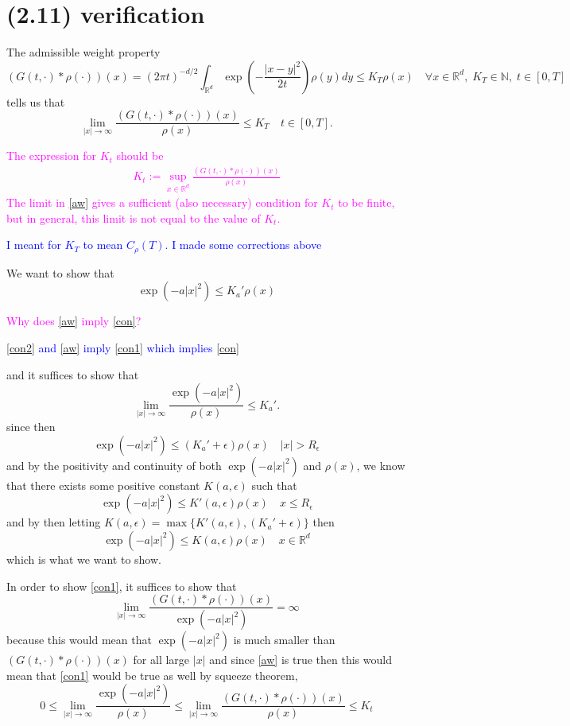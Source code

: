 \documentclass{article}
\numberwithin{equation}{section}
\newcommand{\R}{\mathbb{R}}
\begin{document}
\section{(2.11) verification}
The admissible weight property
\[
\left(G(t,\cdot)*\rho(\cdot)\right)(x) =(2\pi t)^{-d/2} \int_{\mathbb R^d}\exp\left(-\frac{|x-y|^2}{2t}\right)\rho(y)dy \le K_T\rho(x) \quad \forall x \in \mathbb R^d,\; K_T \in \mathbb N,\; t\in[0,T]
\]
tells us that
\begin{equation} \label{aw}
\lim_{|x| \to \infty}\frac{\left(G(t,\cdot)*\rho(\cdot)\right)(x)}{\rho(x)} \le K_T \quad t \in [0,T].
\end{equation}

\bigskip
\textcolor{magenta}{The expression for $K_t$ should be
\begin{align*}
	K_t:= \sup_{x\in\R^d} \frac{\left(G(t,\cdot)*\rho(\cdot)\right)(x)}{\rho(x)}
\end{align*}
The limit in \eqref{aw} gives a sufficient (also necessary) condition for $K_t$ to be finite, but in general, this limit is not equal to the value of $K_t$.
}

\textcolor{blue}{I meant for $K_T$ to mean $C_\rho(T)$. I made some corrections above}


We want to show that
\begin{equation} \label{con}
\exp\left(-a|x|^2\right) \le K_a'\rho(x)
\end{equation}

\bigskip
\textcolor{magenta}{Why does \eqref{aw} imply \eqref{con}?}

\textcolor{blue}{\eqref{con2} and \eqref{aw} imply \eqref{con1} which implies \eqref{con}}

and it suffices to show that
\begin{equation} \label{con1}
\lim_{|x| \to \infty}\frac{\exp\left(-a|x|^2\right)}{\rho(x)} \le K_a'.
\end{equation}
since then
\[
\exp\left(-a|x|^2\right) \le (K_a'+\epsilon)\rho(x) \quad |x|>R_\epsilon
\]
and by the positivity and continuity of both $	\exp\left(-a|x|^2\right)$ and $\rho(x)$, we know that there exists some positive constant $K(a,\epsilon)$ such that
\[
\exp\left(-a|x|^2\right) \le K'(a,\epsilon)\rho(x) \quad x\le R_\epsilon
\]
and by then letting $K(a,\epsilon) = \max\{K'(a,\epsilon),(K_a'+\epsilon)\}$ then
\[
	\exp\left(-a|x|^2\right) \le K(a,\epsilon)\rho(x) \quad x \in \R^d
\]
which is what we want to show.

In order to show \eqref{con1}, it suffices to show that
\begin{equation} \label{con2}
	\lim_{|x| \to \infty} \frac{\left(G(t,\cdot)*\rho(\cdot)\right)(x)}{\exp\left(-a|x|^2\right)} = \infty
\end{equation}
because this would mean that $\exp\left(-a|x|^2\right)$ is much smaller than $\left(G(t,\cdot)*\rho(\cdot)\right)(x)$ for all large $|x|$ and since \eqref{aw} is true then this would mean that \eqref{con1} would be true as well by squeeze theorem,
\[
	0 \le \lim_{|x| \to \infty}\frac{\exp\left(-a|x|^2\right)}{\rho(x)} \le  \lim_{|x| \to \infty} \frac{\left(G(t,\cdot)*\rho(\cdot)\right)(x)}{\rho(x)} \le K_t
\]
\end{document}
